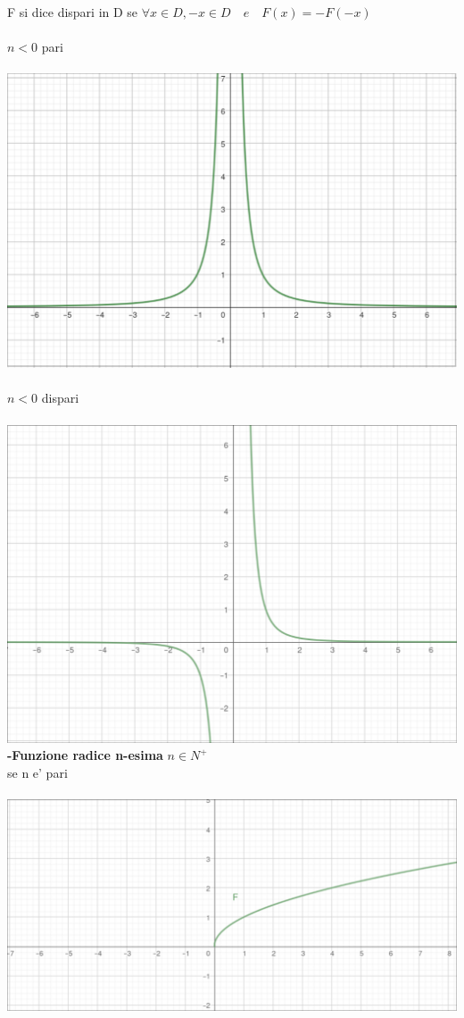 \documentclass{article}
\begin{document}
F si dice dispari in D se $\forall x \in D, -x \in D\quad e \quad F(x)=-F(-x)$\\
\\
$n<0 $ pari\\
\\
\includegraphics{./immagini/funzione-potenza-pari-minore.png}
\\
\\$n<0 $ dispari\\
\\
\includegraphics{./immagini/funzione-potenza-dispari-minore.png}
\\
\textbf{-Funzione radice n-esima} $n \in N^{+}$\\
se n e' pari\\
\\
\includegraphics{./immagini/funzione-radice-pari.png}
\end{document}
